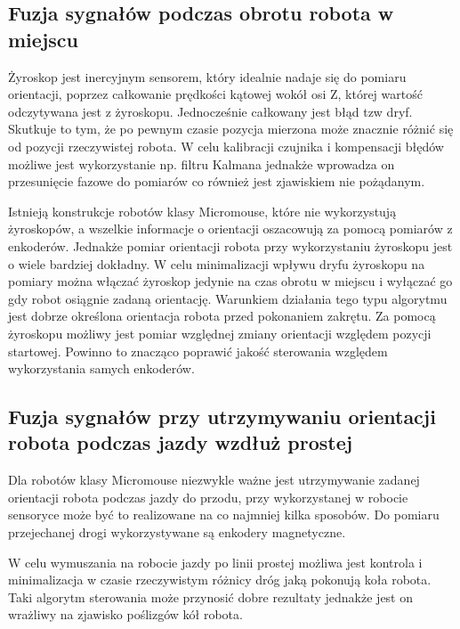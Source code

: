 \documentclass[12pt,a4paper,twoside,openright,fleqn]{mwrep}
\begin{document}
\subsection{Fuzja sygnałów podczas obrotu robota w miejscu} 
Żyroskop jest inercyjnym sensorem, który idealnie nadaje się do pomiaru orientacji, poprzez całkowanie prędkości kątowej wokół osi Z, której wartość odczytywana jest z żyroskopu. Jednocześnie całkowany jest błąd tzw dryf. Skutkuje to tym, że po pewnym czasie pozycja mierzona może znacznie różnić się od pozycji rzeczywistej robota. W celu kalibracji czujnika i kompensacji błędów możliwe jest wykorzystanie np. filtru Kalmana jednakże wprowadza on przesunięcie fazowe do pomiarów co również jest zjawiskiem nie pożądanym.


Istnieją konstrukcje robotów klasy Micromouse, które nie wykorzystują żyroskopów, a wszelkie informacje o orientacji oszacowują za pomocą pomiarów z enkoderów. Jednakże pomiar orientacji robota przy wykorzystaniu żyroskopu jest o wiele bardziej dokładny. W celu minimalizacji wpływu dryfu żyroskopu na pomiary można włączać żyroskop jedynie na czas obrotu w miejscu i wyłączać go gdy robot osiągnie zadaną orientację. Warunkiem działania tego typu algorytmu jest dobrze określona orientacja robota przed pokonaniem zakrętu. Za pomocą żyroskopu możliwy jest pomiar względnej zmiany orientacji względem pozycji startowej. Powinno to znacząco poprawić jakość sterowania względem wykorzystania samych enkoderów. 

\subsection{Fuzja sygnałów przy utrzymywaniu orientacji robota podczas jazdy wzdłuż prostej} 

Dla robotów klasy Micromouse niezwykle ważne jest utrzymywanie zadanej orientacji robota podczas jazdy do przodu, przy wykorzystanej w robocie sensoryce może być to realizowane na co najmniej kilka sposobów. Do pomiaru przejechanej drogi wykorzystywane są enkodery magnetyczne. 

W celu wymuszania na robocie jazdy po linii prostej możliwa jest kontrola i minimalizacja w czasie rzeczywistym różnicy dróg jaką pokonują koła robota. Taki algorytm sterowania może przynosić dobre rezultaty jednakże jest on wrażliwy na zjawisko poślizgów kół robota. 
\end{document}
